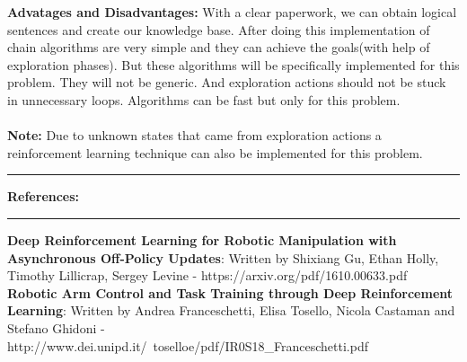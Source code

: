 \documentclass[11pt]{article}
\newcommand\question[2]{\vspace{.25in}\hrule\textbf{#1: #2}\vspace{.5em}\hrule\vspace{.10in}}
\renewcommand\part[1]{\vspace{.10in}\textbf{#1}}
\begin{document}
	\part{Advatages and Disadvantages:} With a clear paperwork, we can obtain logical sentences and create our knowledge base. After doing this implementation of chain algorithms are very simple and they can achieve the goals(with help of exploration phases). But these algorithms will be specifically implemented for this problem. They will not be generic. And exploration actions should not be stuck in unnecessary loops. Algorithms can be fast but only for this problem. \\ \ \\
	
	\part{Note:} Due to unknown states that came from exploration actions a reinforcement learning technique can also be implemented for this problem.
		
	\question{References}{}
	\part{Deep Reinforcement Learning for Robotic Manipulation with Asynchronous Off-Policy Updates}: Written by Shixiang Gu, Ethan Holly, Timothy Lillicrap, Sergey Levine - https://arxiv.org/pdf/1610.00633.pdf\\
	\part{Robotic Arm Control and Task Training through Deep Reinforcement Learning}: Written by Andrea Franceschetti, Elisa Tosello, Nicola Castaman and Stefano Ghidoni - http://www.dei.unipd.it/~toselloe/pdf/IR0S18\_Franceschetti.pdf
\end{document}
